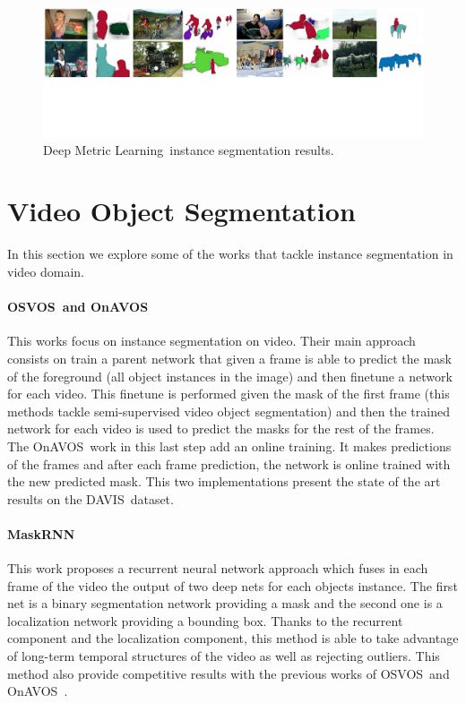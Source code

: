 \begin{figure}[h]
  \centering
  \includegraphics[width=1.\linewidth]{figures/deep_metric_learning/mask_classification.pdf}
  \caption{Deep Metric Learning~\deepml instance segmentation results. }
  \label{fig:deep_metric_learning}
\end{figure}

\section{Video Object Segmentation}
\label{sec:soa:videoobjectsegmentation}

In this section we explore some of the works that tackle instance segmentation in video domain.

\paragraph{OSVOS~\osvos and OnAVOS~\onavos}
This works focus on instance segmentation on video.
Their main approach consists on train a parent network that given a frame is able to predict the mask of the foreground (all object instances in the image) and then finetune a network for each video.
This finetune is performed given the mask of the first frame (this methods tackle semi-supervised video object segmentation) and then the trained network for each video is used to predict the masks for the rest of the frames.
The OnAVOS~\onavos work in this last step add an online training.
It makes predictions of the frames and after each frame prediction, the network is online trained with the new predicted mask.
This two implementations present the state of the art results on the DAVIS~\davisboth dataset.

\paragraph{MaskRNN~\maskrnn}
This work proposes a recurrent neural network approach which fuses in each frame of the video the output of two deep nets for each objects instance.
The first net is a binary segmentation network providing a mask and the second one is a localization network providing a bounding box.
Thanks to the recurrent component and the localization component, this method is able to take advantage of long-term temporal structures of the video as well as rejecting outliers.
This method also provide competitive results with the previous works of OSVOS~\osvos and OnAVOS~\onavos.

